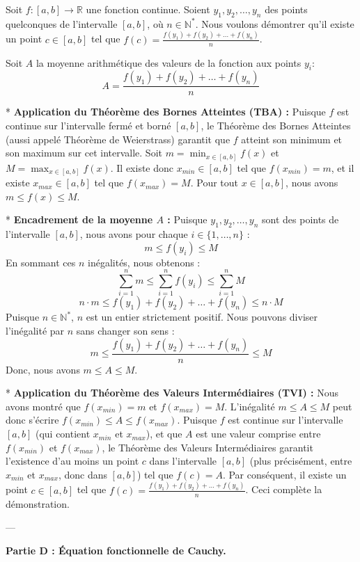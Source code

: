 \documentclass[12pt,a4paper]{report}
\begin{document}
Soit $f: [a,b] \to \mathbb{R}$ une fonction continue. Soient $y_1, y_2, \dots, y_n$ des points quelconques de l'intervalle $[a,b]$, où $n \in \mathbb{N}^*$. Nous voulons démontrer qu'il existe un point $c \in [a,b]$ tel que $f(c) = \frac{f(y_1) + f(y_2) + \dots + f(y_n)}{n}$.

Soit $A$ la moyenne arithmétique des valeurs de la fonction aux points $y_i$:
$$ A = \frac{f(y_1) + f(y_2) + \dots + f(y_n)}{n} $$

*   \textbf{Application du Théorème des Bornes Atteintes (TBA) :}
    Puisque $f$ est continue sur l'intervalle fermé et borné $[a,b]$, le Théorème des Bornes Atteintes (aussi appelé Théorème de Weierstrass) garantit que $f$ atteint son minimum et son maximum sur cet intervalle.
    Soit $m = \min_{x \in [a,b]} f(x)$ et $M = \max_{x \in [a,b]} f(x)$.
    Il existe donc $x_{min} \in [a,b]$ tel que $f(x_{min}) = m$, et il existe $x_{max} \in [a,b]$ tel que $f(x_{max}) = M$.
    Pour tout $x \in [a,b]$, nous avons $m \le f(x) \le M$.

*   \textbf{Encadrement de la moyenne $A$ :}
    Puisque $y_1, y_2, \dots, y_n$ sont des points de l'intervalle $[a,b]$, nous avons pour chaque $i \in \{1, \dots, n\}$ :
    $$ m \le f(y_i) \le M $$
    En sommant ces $n$ inégalités, nous obtenons :
    $$ \sum_{i=1}^n m \le \sum_{i=1}^n f(y_i) \le \sum_{i=1}^n M $$
    $$ n \cdot m \le f(y_1) + f(y_2) + \dots + f(y_n) \le n \cdot M $$
    Puisque $n \in \mathbb{N}^*$, $n$ est un entier strictement positif. Nous pouvons diviser l'inégalité par $n$ sans changer son sens :
    $$ m \le \frac{f(y_1) + f(y_2) + \dots + f(y_n)}{n} \le M $$
    Donc, nous avons $m \le A \le M$.

*   \textbf{Application du Théorème des Valeurs Intermédiaires (TVI) :}
    Nous avons montré que $f(x_{min}) = m$ et $f(x_{max}) = M$.
    L'inégalité $m \le A \le M$ peut donc s'écrire $f(x_{min}) \le A \le f(x_{max})$.
    Puisque $f$ est continue sur l'intervalle $[a,b]$ (qui contient $x_{min}$ et $x_{max}$), et que $A$ est une valeur comprise entre $f(x_{min})$ et $f(x_{max})$, le Théorème des Valeurs Intermédiaires garantit l'existence d'au moins un point $c$ dans l'intervalle $[a,b]$ (plus précisément, entre $x_{min}$ et $x_{max}$, donc dans $[a,b]$) tel que $f(c) = A$.
    Par conséquent, il existe un point $c \in [a,b]$ tel que $f(c) = \frac{f(y_1) + f(y_2) + \dots + f(y_n)}{n}$.
    Ceci complète la démonstration.

---

\textbf{Partie D : Équation fonctionnelle de Cauchy.}
\end{document}
